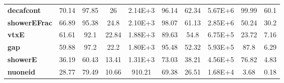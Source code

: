 \begin{table}[!hb]
\begin{tabular}{|l|ccc|ccc|ccc|}
\textbf{decafcont}    & 70.14             & 97.85                                                              & 26                                        & 2.14E+3               & 96.14                                                               & 62.34                                      & 5.67E+6           & 99.99                                                               & 60.1                                       \\
\textbf{showerEFrac}  & 66.89             & 95.38                                                              & 24.8                                      & 2.10E+3               & 98.07                                                               & 61.13                                      & 2.85E+6           & 50.24                                                               & 30.2                                       \\
\textbf{vtxE}         & 61.61             & 92.1                                                               & 22.84                                     & 1.88E+3               & 89.63                                                               & 54.8                                       & 6.75E+5            & 23.72                                                               & 7.16                                       \\
\textbf{gap}          & 59.88             & 97.2                                                               & 22.2                                      & 1.80E+3               & 95.48                                                               & 52.32                                      & 5.93E+5            & 87.8                                                                & 6.29                                       \\
\textbf{showerE}      & 36.19             & 60.43                                                              & 13.41                                     & 1.31E+3               & 73.03                                                               & 38.21                                      & 4.56E+5            & 76.82                                                               & 4.83                                       \\
\textbf{nuoneid}      & 28.77             & 79.49                                                              & 10.66                                     & 910.21             & 69.38                                                               & 26.51                                      & 1.68E+4             & 3.68                                                                & 0.18                                       \\

\end{tabular}
\end{table}
